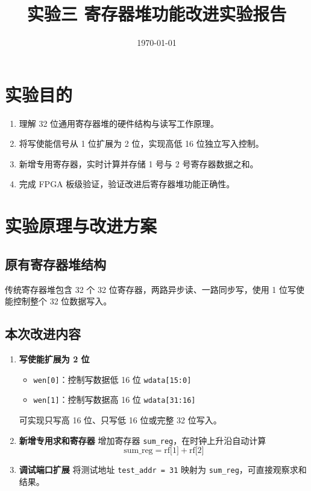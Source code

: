 \documentclass[12pt,a4paper]{article}
\begin{document}
\title{\textbf{实验三 寄存器堆功能改进实验报告}}
\date{\today}
\maketitle

\section{实验目的}
\begin{enumerate}
    \item 理解 32 位通用寄存器堆的硬件结构与读写工作原理。
    \item 将写使能信号从 1 位扩展为 2 位，实现高低 16 位独立写入控制。
    \item 新增专用寄存器，实时计算并存储 1 号与 2 号寄存器数据之和。
    \item 完成 FPGA 板级验证，验证改进后寄存器堆功能正确性。
\end{enumerate}

\section{实验原理与改进方案}
\subsection{原有寄存器堆结构}
传统寄存器堆包含 32 个 32 位寄存器，两路异步读、一路同步写，使用 1 位写使能控制整个 32 位数据写入。

\subsection{本次改进内容}
\begin{enumerate}
    \item \textbf{写使能扩展为 2 位}
    \begin{itemize}
        \item \texttt{wen[0]}：控制写数据低 16 位 \texttt{wdata[15:0]}
        \item \texttt{wen[1]}：控制写数据高 16 位 \texttt{wdata[31:16]}
    \end{itemize}
    可实现只写高 16 位、只写低 16 位或完整 32 位写入。

    \item \textbf{新增专用求和寄存器}
    增加寄存器 \texttt{sum\_reg}，在时钟上升沿自动计算
    \[
    \text{sum\_reg} = \text{rf[1]} + \text{rf[2]}
    \]

    \item \textbf{调试端口扩展}
    将测试地址 \texttt{test\_addr = 31} 映射为 \texttt{sum\_reg}，可直接观察求和结果。
\end{enumerate}
\end{document}
